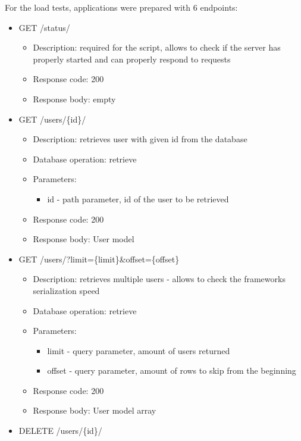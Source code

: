 For the load tests, applications were prepared with 6 endpoints:
\begin{itemize}
  \item GET /status/
        \begin{itemize}
          \item Description: required for the script, allows to check if the server has properly started and can properly respond to requests
          \item Response code: 200
          \item Response body: empty
        \end{itemize}
  \item GET /users/\{id\}/
        \begin{itemize}
          \item Description: retrieves user with given id from the database
          \item Database operation: retrieve
          \item Parameters:
                \begin{itemize}
                  \item id - path parameter, id of the user to be retrieved
                \end{itemize}
          \item Response code: 200
          \item Response body: User model
        \end{itemize}
  \item GET /users/?limit=\{limit\}\&offset=\{offset\}
        \begin{itemize}
          \item Description: retrieves multiple users - allows to check the frameworks serialization speed
          \item Database operation: retrieve
          \item Parameters:
                \begin{itemize}
                  \item limit - query parameter, amount of users returned
                  \item offset - query parameter, amount of rows to skip from the beginning
                \end{itemize}
          \item Response code: 200
          \item Response body: User model array
        \end{itemize}
  \item DELETE /users/\{id\}/

\end{itemize}
